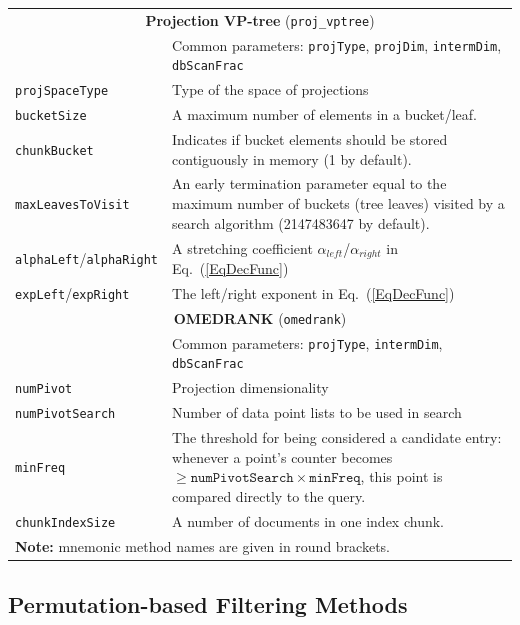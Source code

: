 \documentclass[runningheads,a4paper]{llncs}
\newcommand{\ttt}[1]{\texttt{#1}}
\begin{document}
{\begin{table}
\begin{tabular}{l@{\hspace{2mm}}p{3.5in}}
\cmidrule(l){1-2} 
\multicolumn{2}{c}{\textbf{Projection VP-tree} (\ttt{proj\_vptree}) } 
\\
\cmidrule(l){1-2} 
                     & Common parameters: \ttt{projType}, \ttt{projDim}, \ttt{intermDim}, \ttt{dbScanFrac} \\
 \ttt{projSpaceType} & Type of the space of projections                 \\
 \ttt{bucketSize}    & A maximum number of elements in a bucket/leaf.    \\
 \ttt{chunkBucket}   & Indicates if bucket elements should be stored contiguously in memory (1 by default).  \\
 \ttt{maxLeavesToVisit}  & An early termination parameter equal to the maximum number of buckets (tree leaves) visited by a search algorithm (2147483647 by default). \\
 \ttt{alphaLeft}/\ttt{alphaRight}   & A stretching coefficient $\alpha_{left}$/$\alpha_{right}$ in Eq.~(\ref{EqDecFunc}) \\
 \ttt{expLeft}/\ttt{expRight} & The left/right exponent in Eq.~(\ref{EqDecFunc}) \\
\cmidrule(l){1-2} 
\multicolumn{2}{c}{\textbf{OMEDRANK} \cite{Fagin2003} (\ttt{omedrank}) } 
\\
\cmidrule(l){1-2} 
                     & Common parameters: \ttt{projType}, \ttt{intermDim}, \ttt{dbScanFrac} \\
\ttt{numPivot}       & Projection dimensionality \\
\ttt{numPivotSearch} & Number of data point lists to be used in search \\
\ttt{minFreq}        & The threshold for being considered a candidate entry: whenever
                       a point's counter becomes $\ge\ttt{numPivotSearch}\times\ttt{minFreq}$,
                       this point is compared directly to the query.  \\
\ttt{chunkIndexSize} & A number of documents in one index chunk.  \\
\bottomrule
\multicolumn{2}{l}{\textbf{Note:} mnemonic method names are given in round brackets.}
\end{tabular}
\vspace{2em}
\end{table}

\subsection{Permutation-based Filtering Methods} \label{SectionPermMethod}

}
\end{document}
